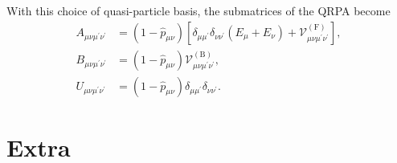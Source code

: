 With this choice of quasi-particle basis, the submatrices of the QRPA become
\begin{align}
    A_{\mu \nu \mu^{\prime} \nu^{\prime}} &= \left(1-\hat{p}_{\mu \nu}\right)\left[\delta_{\mu \mu^{\prime}} \delta_{\nu \nu^{\prime}}\left(E_\mu+E_\nu\right)+\mathcal{V}_{\mu \nu \mu^{\prime} \nu^{\prime}}^{(\mathrm{F})}\right], \\
    B_{\mu \nu \mu^{\prime} \nu^{\prime}} &= \left(1-\hat{p}_{\mu \nu}\right) \mathcal{V}_{\mu \nu \mu^{\prime} \nu^{\prime}}^{(\mathrm{B})}, \\
    U_{\mu \nu \mu^{\prime} \nu^{\prime}} &= \left(1-\hat{p}_{\mu \nu}\right) \delta_{\mu \mu^{\prime}} \delta_{\nu \nu^{\prime}} .
\end{align}
\section{Extra}
